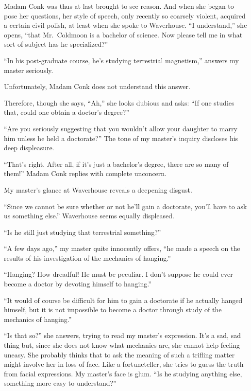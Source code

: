 \documentclass{book}
\begin{document}
Madam Conk was thus at last brought to see reason. And when she began to
pose her questions, her style of speech, only recently so coarsely
violent, acquired a certain civil polish, at least when she spoke to
Waverhouse. ``I understand,'' she opens, ``that Mr.~Coldmoon is a
bachelor of science. Now please tell me in what sort of subject has he
specialized?''

``In his post-graduate course, he's studying terrestrial magnetism,''
answers my master seriously.

Unfortunately, Madam Conk does not understand this answer.

Therefore, though she says, ``Ah,'' she looks dubious and asks: ``If one
studies that, could one obtain a doctor's degree?''

``Are you seriously suggesting that you wouldn't allow your daughter to
marry him unless he held a doctorate?'' The tone of my master's inquiry
discloses his deep displeasure.

``That's right. After all, if it's just a bachelor's degree, there are
so many of them!'' Madam Conk replies with complete unconcern.

My master's glance at Waverhouse reveals a deepening disgust.

``Since we cannot be sure whether or not he'll gain a doctorate, you'll
have to ask us something else.'' Waverhouse seems equally displeased.

``Is he still just studying that terrestrial something?''

``A few days ago,'' my master quite innocently offers, ``he made a
speech on the results of his investigation of the mechanics of
hanging.''

``Hanging? How dreadful! He must be peculiar. I don't suppose he could
ever become a doctor by devoting himself to hanging.''

``It would of course be difficult for him to gain a doctorate if he
actually hanged himself, but it is not impossible to become a doctor
through study of the mechanics of hanging.''

``Is that so?'' she answers, trying to read my master's expression. It's
a sad, sad thing but, since she does not know what mechanics are, she
cannot help feeling uneasy. She probably thinks that to ask the meaning
of such a trifling matter might involve her in loss of face. Like a
fortuneteller, she tries to guess the truth from facial expressions. My
master's face is glum. ``Is he studying anything else, something more
easy to understand?''
\end{document}
